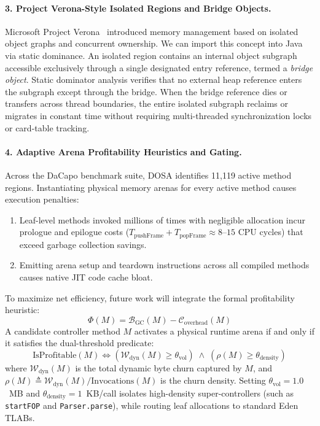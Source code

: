 \documentclass[12pt,a4paper]{article}
\begin{document}
\paragraph{3. Project Verona-Style Isolated Regions and Bridge Objects.}
Microsoft Project Verona~\cite{verona2019} introduced memory management based on isolated object graphs and concurrent ownership. We can import this concept into Java via static dominance. An isolated region contains an internal object subgraph accessible exclusively through a single designated entry reference, termed a \emph{bridge object}. Static dominator analysis verifies that no external heap reference enters the subgraph except through the bridge. When the bridge reference dies or transfers across thread boundaries, the entire isolated subgraph reclaims or migrates in constant time without requiring multi-threaded synchronization locks or card-table tracking.

\paragraph{4. Adaptive Arena Profitability Heuristics and Gating.}
Across the DaCapo benchmark suite, DOSA identifies 11{,}119 active method regions. Instantiating physical memory arenas for every active method causes execution penalties:
\begin{enumerate}[leftmargin=*]
  \item Leaf-level methods invoked millions of times with negligible allocation incur prologue and epilogue costs ($T_{\text{pushFrame}} + T_{\text{popFrame}} \approx 8\text{--}15$ CPU cycles) that exceed garbage collection savings.
  \item Emitting arena setup and teardown instructions across all compiled methods causes native JIT code cache bloat.
\end{enumerate}
To maximize net efficiency, future work will integrate the formal profitability heuristic:
\begin{equation}
\Phi(M) = \mathcal{B}_{\text{GC}}(M) - \mathcal{C}_{\text{overhead}}(M)
\end{equation}
A candidate controller method $M$ activates a physical runtime arena if and only if it satisfies the dual-threshold predicate:
\begin{equation}
\text{IsProfitable}(M) \iff \left( \mathcal{W}_{\text{dyn}}(M) \ge \theta_{\text{vol}} \right) \;\land\; \left( \rho(M) \ge \theta_{\text{density}} \right)
\end{equation}
where $\mathcal{W}_{\text{dyn}}(M)$ is the total dynamic byte churn captured by $M$, and $\rho(M) \triangleq \mathcal{W}_{\text{dyn}}(M) / \text{Invocations}(M)$ is the churn density. Setting $\theta_{\text{vol}} = 1.0$~MB and $\theta_{\text{density}} = 1$~KB/call isolates high-density super-controllers (such as \texttt{startFOP} and \texttt{Parser.parse}), while routing leaf allocations to standard Eden TLABs.
\end{document}
